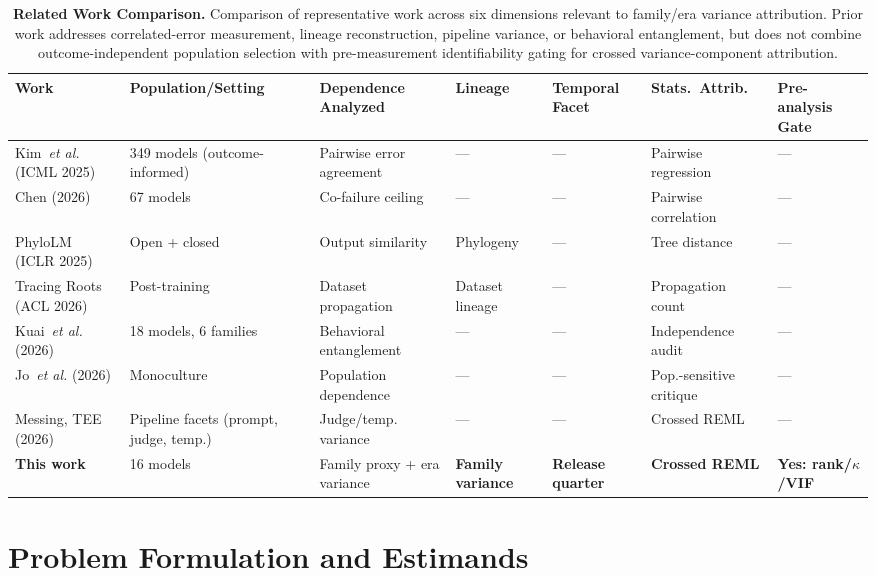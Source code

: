 \documentclass{ieeeaccess}
\theoremstyle{definition}
\theoremstyle{plain}
\begin{document}
\begin{table}[!htbp]
\caption{\textbf{Related Work Comparison.} Comparison of representative work across six dimensions relevant to family/era variance attribution. Prior work addresses correlated-error measurement, lineage reconstruction, pipeline variance, or behavioral entanglement, but does not combine outcome-independent population selection with pre-measurement identifiability gating for crossed variance-component attribution.}
\label{tab:diff}
\centering
\footnotesize
\setlength{\tabcolsep}{3.5pt}
\begin{tabular}{p{90pt}p{70pt}p{92pt}p{50pt}p{34pt}p{62pt}p{58pt}}
\hline
\textbf{Work} & \textbf{Population/Setting} & \textbf{Dependence Analyzed} & \textbf{Lineage} & \textbf{Temporal Facet} & \textbf{Stats.\ Attrib.} & \textbf{Pre-analysis Gate} \\
\hline
Kim~\textit{et al.} (ICML 2025) & 349 models (outcome-informed) & Pairwise error agreement & --- & --- & Pairwise regression & --- \\
\hline
Chen (2026) & 67 models & Co-failure ceiling & --- & --- & Pairwise correlation & --- \\
\hline
PhyloLM (ICLR 2025) & Open + closed & Output similarity & Phylogeny & --- & Tree distance & --- \\
\hline
Tracing Roots (ACL 2026) & Post-training & Dataset propagation & Dataset lineage & --- & Propagation count & --- \\
\hline
Kuai~\textit{et al.} (2026) & 18 models, 6 families & Behavioral entanglement & --- & --- & Independence audit & --- \\
\hline
Jo~\textit{et al.} (2026) & Monoculture & Population dependence & --- & --- & Pop.-sensitive critique & --- \\
\hline
Messing, TEE (2026) & Pipeline facets (prompt, judge, temp.) & Judge/temp. variance & --- & --- & Crossed REML & --- \\
\hline
\hline
\textbf{This work} & 16 models & Family proxy + era variance & \textbf{Family variance} & \textbf{Release quarter} & \textbf{Crossed REML} & \textbf{Yes: rank/$\kappa$/VIF} \\
\hline
\end{tabular}
\end{table}

\section{Problem Formulation and Estimands}
\label{sec:model}
\end{document}
